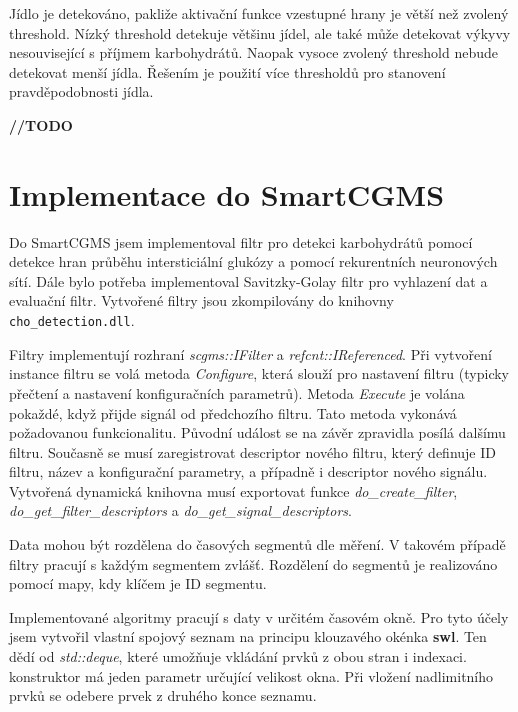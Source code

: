 Jídlo je detekováno, pakliže aktivační funkce vzestupné hrany je větší než zvolený threshold. Nízký threshold detekuje většinu jídel, ale také může detekovat výkyvy nesouvisející s příjmem karbohydrátů. Naopak vysoce zvolený threshold nebude detekovat menší jídla. Řešením je použití více thresholdů pro stanovení pravděpodobnosti jídla.

\textbf{//TODO}



\section{Implementace do SmartCGMS}
\label{ch:implementace_scgms}

Do SmartCGMS jsem implementoval filtr pro detekci karbohydrátů pomocí detekce hran průběhu intersticiální glukózy a pomocí rekurentních neuronových sítí. Dále bylo potřeba implementoval Savitzky-Golay filtr pro vyhlazení dat a evaluační filtr. Vytvořené filtry jsou zkompilovány do knihovny \texttt{cho\_detection.dll}.

Filtry implementují rozhraní \textit{scgms::IFilter} a \textit{refcnt::IReferenced}. Při vytvoření instance filtru se volá metoda \textit{Configure}, která slouží pro nastavení filtru (typicky přečtení a nastavení konfiguračních parametrů). Metoda \textit{Execute} je volána pokaždé, když přijde signál od předchozího filtru. Tato metoda vykonává požadovanou funkcionalitu. Původní událost se na závěr zpravidla posílá dalšímu filtru. Současně se musí zaregistrovat descriptor nového filtru, který definuje ID filtru, název a konfigurační parametry, a případně i descriptor nového signálu. Vytvořená dynamická knihovna musí exportovat funkce \textit{do\_create\_filter}, \textit{do\_get\_filter\_descriptors} a \textit{do\_get\_signal\_descriptors}.

Data mohou být rozdělena do časových segmentů dle měření. V takovém případě filtry pracují s každým segmentem zvlášť. Rozdělení do segmentů je realizováno pomocí mapy, kdy klíčem je ID segmentu.

Implementované algoritmy pracují s daty v určitém časovém okně. Pro tyto účely jsem vytvořil vlastní spojový seznam na principu klouzavého okénka \textbf{swl}. Ten dědí od \textit{std::deque}, které umožňuje vkládání prvků z obou stran i indexaci. konstruktor má jeden parametr určující velikost okna. Při vložení nadlimitního prvků se odebere prvek z druhého konce seznamu.

